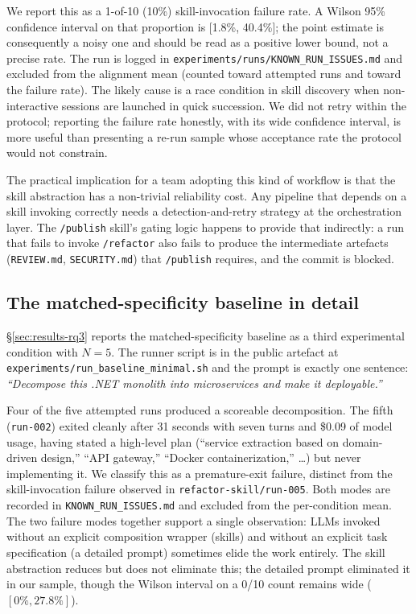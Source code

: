 \documentclass[journal]{IEEEtran}
\begin{document}
We report this as a 1-of-10 (10\%) skill-invocation failure rate.
A Wilson 95\% confidence interval on that proportion is
[1.8\%, 40.4\%]; the point estimate is consequently a noisy one and
should be read as a positive lower bound, not a precise rate. The
run is logged in \texttt{experiments/runs/KNOWN\_RUN\_ISSUES.md}
and excluded from the alignment mean (counted toward attempted
runs and toward the failure rate). The likely cause is a race
condition in skill discovery when non-interactive sessions are
launched in quick succession. We did not retry within the
protocol; reporting the failure rate honestly, with its wide
confidence interval, is more useful than presenting a re-run
sample whose acceptance rate the protocol would not constrain.

The practical implication for a team adopting this kind of workflow
is that the skill abstraction has a non-trivial reliability cost.
Any pipeline that depends on a skill invoking correctly needs a
detection-and-retry strategy at the orchestration layer. The
\texttt{/publish} skill's gating logic happens to provide that
indirectly: a run that fails to invoke \texttt{/refactor} also
fails to produce the intermediate artefacts (\texttt{REVIEW.md},
\texttt{SECURITY.md}) that \texttt{/publish} requires, and the
commit is blocked.

\subsection{The matched-specificity baseline in detail}
\label{sec:ablation-prompt}

\S\ref{sec:results-rq3} reports the matched-specificity baseline
as a third experimental condition with $N{=}5$. The runner script
is in the public artefact at
\texttt{experiments/run\_baseline\_minimal.sh} and the prompt is
exactly one sentence:
\textit{``Decompose this .NET monolith into microservices and make
it deployable.''}

Four of the five attempted runs produced a scoreable decomposition.
The fifth (\texttt{run-002}) exited cleanly after 31 seconds with
seven turns and \$0.09 of model usage, having stated a high-level
plan (``service extraction based on domain-driven design,'' ``API
gateway,'' ``Docker containerization,'' \ldots) but never
implementing it. We classify this as a premature-exit failure,
distinct from the skill-invocation failure observed in
\texttt{refactor-skill/run-005}. Both modes are recorded in
\texttt{KNOWN\_RUN\_ISSUES.md} and excluded from the per-condition
mean. The two failure modes together support a single observation:
LLMs invoked without an explicit composition wrapper (skills) and
without an explicit task specification (a detailed prompt) sometimes
elide the work entirely. The skill abstraction reduces but does
not eliminate this; the detailed prompt eliminated it in our
sample, though the Wilson interval on a 0/10 count remains wide
($[0\%, 27.8\%]$).
\end{document}
